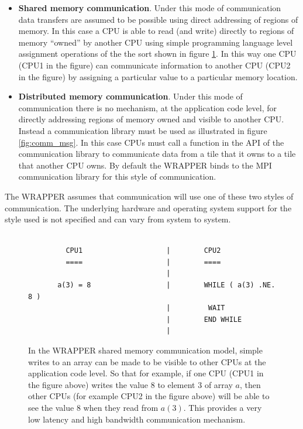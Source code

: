\begin{itemize}
\item {\bf Shared memory communication}.  Under this mode of
  communication data transfers are assumed to be possible using direct
  addressing of regions of memory.  In this case a CPU is able to read
  (and write) directly to regions of memory ``owned'' by another CPU
  using simple programming language level assignment operations of the
  the sort shown in figure \ref{fig:simple_assign}.  In this way one
  CPU (CPU1 in the figure) can communicate information to another CPU
  (CPU2 in the figure) by assigning a particular value to a particular
  memory location.

\item {\bf Distributed memory communication}.  Under this mode of
  communication there is no mechanism, at the application code level,
  for directly addressing regions of memory owned and visible to
  another CPU. Instead a communication library must be used as
  illustrated in figure \ref{fig:comm_msg}. In this case CPUs must
  call a function in the API of the communication library to
  communicate data from a tile that it owns to a tile that another CPU
  owns. By default the WRAPPER binds to the MPI communication library
  \cite{MPI-std-20} for this style of communication.
\end{itemize}

The WRAPPER assumes that communication will use one of these two styles
of communication.  The underlying hardware and operating system support
for the style used is not specified and can vary from system to system.

\begin{figure}
\begin{verbatim}

         CPU1                    |        CPU2
         ====                    |        ====
                                 |
       a(3) = 8                  |        WHILE ( a(3) .NE. 8 ) 
                                 |         WAIT
                                 |        END WHILE
                                 |
\end{verbatim}
\caption{In the WRAPPER shared memory communication model, simple writes to an
array can be made to be visible to other CPUs at the application code level.
So that for example, if one CPU (CPU1 in the figure above) writes the value $8$ to 
element $3$ of array $a$, then other CPUs (for example CPU2 in the figure above)
will be able to see the value $8$ when they read from $a(3)$.
This provides a very low latency and high bandwidth communication 
mechanism.
} \label{fig:simple_assign}
\end{figure}

